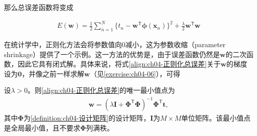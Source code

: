\documentclass[../../main.tex]{subfiles}
\begin{document}
那么总误差函数将变成

\begin{align}
  E(\boldsymbol{w})=\frac{1}{2}\sum_{n=1}^{N}\bigl\{t_n-\boldsymbol{w}^{\mathsf{T}}\boldsymbol{\phi}(\boldsymbol{x}_n)\bigr\}^2+\frac{\lambda}{2}\boldsymbol{w}^{\mathsf{T}}\boldsymbol{w}
  \label{align:ch04-正则化总误差}
\end{align}

在统计学中，正则化方法会将参数值向$0$减小，这为参数收缩（parameter shrinkage）提供了一个示例。这一方法的优势是，由于误差函数仍然是$\boldsymbol{w}$的二次函数，因此它具有闭式解。具体来说，将式\eqref{align:ch04-正则化总误差}关于$\boldsymbol{w}$的梯度设为$\boldsymbol{0}$，并像之前一样求解$\boldsymbol{w}$（见\cref{exercise:ch04-06}），可得

\begin{proposition}[正则化最小二乘的闭式解]\label{proposition:ch04-正则化解}
设$\lambda>0$。则\eqref{align:ch04-正则化总误差}的唯一最小值点为
\begin{align}
  \boldsymbol{w}=(\lambda\boldsymbol{I}+\boldsymbol{\Phi}^{\mathsf{T}}\boldsymbol{\Phi})^{-1}\boldsymbol{\Phi}^{\mathsf{T}}\boldsymbol{t},
  \label{align:ch04-正则化解}
\end{align}
其中$\boldsymbol{\Phi}$为\cref{definition:ch04-设计矩阵}的设计矩阵，$\boldsymbol{I}$为$M\times M$单位矩阵。该最小值点是全局最小值，且不要求$\boldsymbol{\Phi}$列满秩。
\end{proposition}
\end{document}
